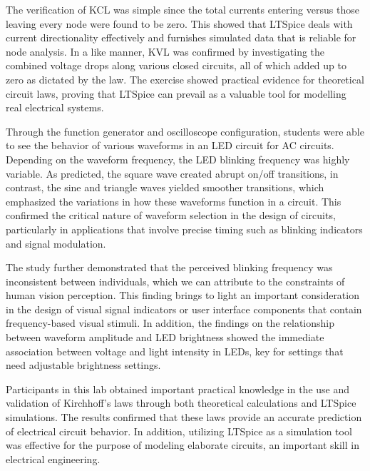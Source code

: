 \documentclass{article}
\begin{document}
The verification of KCL was simple since the total currents entering versus those leaving every node were found 
to be zero. This showed that LTSpice deals with current directionality effectively and furnishes simulated data 
that is reliable for node analysis. In a like manner, KVL was confirmed by investigating the combined voltage drops 
along various closed circuits, all of which added up to zero as dictated by the law. The exercise showed practical 
evidence for theoretical circuit laws, proving that LTSpice can prevail as a valuable tool for modelling real electrical systems.
\newline    

Through the function generator and oscilloscope configuration, students were able to see the behavior of various 
waveforms in an LED circuit for AC circuits. Depending on the waveform frequency, the LED blinking frequency was 
highly variable. As predicted, the square wave created abrupt on/off transitions, in contrast, the sine and triangle 
waves yielded smoother transitions, which emphasized the variations in how these waveforms function in a circuit. 
This confirmed the critical nature of waveform selection in the design of circuits, particularly in applications that
 involve precise timing such as blinking indicators and signal modulation.
\newline

The study further demonstrated that the perceived blinking frequency was inconsistent between individuals, 
which we can attribute to the constraints of human vision perception. This finding brings to light an 
important consideration in the design of visual signal indicators or user interface components that contain 
frequency-based visual stimuli. In addition, the findings on the relationship between waveform amplitude and 
LED brightness showed the immediate association between voltage and light intensity in LEDs, key for settings 
that need adjustable brightness settings.
\newline

Participants in this lab obtained important practical knowledge in the use and validation of Kirchhoff's laws 
through both theoretical calculations and LTSpice simulations. The results confirmed that these laws provide an 
accurate prediction of electrical circuit behavior. In addition, utilizing LTSpice as a simulation tool was effective 
for the purpose of modeling elaborate circuits, an important skill in electrical engineering.
\newline
\end{document}
